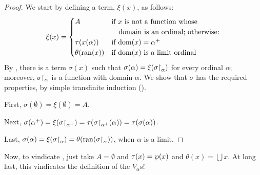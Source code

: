 \documentclass[../../../include/open-logic-section]{subfiles}
\begin{document}
\begin{proof}
We start by defining a term, $\xi(x)$, as follows: 
\[
	\xi(x) = 
	\begin{cases}
			A &\text{if $x$ is not a function whose}\\
			&\hspace{1em}\text{domain is an ordinal; otherwise:}\\
			\tau(x(\alpha)) & \text{if $\dom{x} = \ordsucc{\alpha}$}\\
			\theta(\ran{x}) & \text{if $\dom{x}$ is a limit ordinal}
	\end{cases}
\]
By , there is a term $\sigma(x)$ such that
$\sigma(\alpha) = \xi(\sigma\mathord{\restriction}_{\alpha})$ for every
ordinal $\alpha$; moreover, $\sigma\mathord{\restriction}_{\alpha}$ is a
function with domain $\alpha$. We show that $\sigma$ has the required
properties, by simple transfinite induction
(). 

First, $\sigma(\emptyset) = \xi(\emptyset) = A$. 

Next, $\sigma(\alpha^{+}) = \xi(\sigma\mathord{\restriction}_{\alpha^{+}}) = \tau(\sigma\mathord{\restriction}_{\alpha^{+}}(\alpha)) = \tau(\sigma(\alpha))$.

Last, $\sigma(\alpha) = \xi(\sigma\mathord{\restriction}_{\alpha}) = \theta(\mathrm{ran}(\sigma\mathord{\restriction}_{\alpha}))$, when $\alpha$ is a limit.
\end{proof}
\noindent
Now, to vindicate , just take $A
= \emptyset$ and $\tau(x) = \wp(x)$ and $\theta(x) = \bigcup x$. At long last, this vindicates the definition of the $V_\alpha$s!{}
\end{document}
